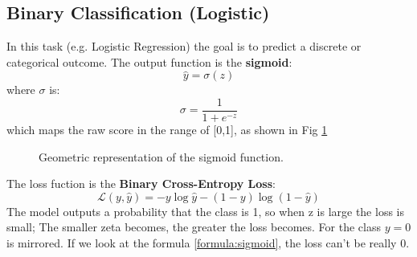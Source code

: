 \subsection{Binary Classification (Logistic)}
In this task (e.g. Logistic Regression) the goal is to predict a discrete or categorical outcome. The 
output function is the \textbf{sigmoid}:
\begin{equation}
    \hat{y} = \sigma(z)
\end{equation}
where $\sigma$ is:
\[
    \sigma = \frac{1}{1+e^{-z}} 
    \label{formula:sigmoid}
\]
which maps the raw score in the range of [0,1], as shown in Fig \ref{fig:sigmoid}
\begin{figure}[H]
    \centering
    \caption{Geometric representation of the sigmoid function.}
    \label{fig:sigmoid}
\end{figure}
The loss fuction is the \textbf{Binary Cross-Entropy Loss}:
\begin{equation}
    \mathcal{L}(y, \hat{y}) = -y \log \hat{y} - (1 - y) \log(1 - \hat{y})
\end{equation}
The model outputs a probability that the class is 1, so when z is large the loss is 
small; The smaller zeta becomes, the greater the loss becomes. For the class $y=0$ is mirrored. If 
we look at the formula \ref{formula:sigmoid}, the loss can't be really 0. 

